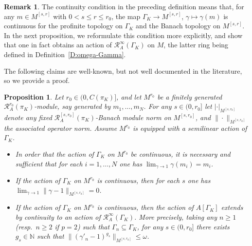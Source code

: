 \documentclass[12pt]{article}
\newtheorem{prop}[theorem]{Proposition}
\theoremstyle{definition}
\newtheorem{remark}[theorem]{Remark}
\numberwithin{equation}{theorem}
\newcommand{\calR}{\mathcal{R}}
\newcommand{\NN}{\mathbb{N}}
\begin{document}
\begin{remark}
The continuity condition in the preceding definition means that, for
any $m \in M^{[s,r]}$ with $0 < s \leq r \leq r_0$, the map $\Gamma_K
\to M^{[s,r]}$, $\gamma \mapsto \gamma(m)$ is continuous for the
profinite topology on $\Gamma_K$ and the Banach topology on
$M^{[s,r]}$.  In the next proposition, we reformulate this condition
more explicitly, and show that one in fact obtains an action of
$\calR_A^\infty(\Gamma_K)$ on $M$, the latter ring being defined in
Definition~\ref{D:omega-Gamma}.
\end{remark}

The following claims are well-known, but not well documented in the
literature, so we provide a proof.

\begin{prop}
\label{P:calR_A(Gamma_K) acts on M}
Let $r_0 \in (0,C(\pi_K)]$, and let $M^{r_0}$ be a finitely generated
  $\calR_A^{r_0}(\pi_K)$-module, say generated by $m_1,\ldots,m_N$.
  For any $s \in (0,r_0]$ let $|\cdot|_{M^{[s,r_0]}}$ denote any fixed
    $\calR_A^{[s,r_0]}(\pi_K)$-Banach module norm on $M^{[s,r_0]}$,
    and $\|\cdot\|_{M^{[s,r_0]}}$ the associated operator norm.
    Assume $M^{r_0}$ is equipped with a semilinear action of
    $\Gamma_K$.
\begin{itemize}
\item[(1)] In order that the action of $\Gamma_K$ on $M^{r_0}$ be
  continuous, it is necessary and sufficient that for each
  $i=1,\ldots,N$ one has $\lim_{\gamma \to 1} \gamma(m_i) = m_i$.
\item[(2)] If the action of $\Gamma_K$ on $M^{r_0}$ is continuous,
  then for each $s$ one has $\lim_{\gamma \to 1}
  \|\gamma-1\|_{M^{[s,r_0]}} = 0$.
\item[(3)] If the action of $\Gamma_K$ on $M^{r_0}$ is continuous,
  then the action of $A[\Gamma_K]$ extends by continuity to an action
  of $\calR^\infty_A(\Gamma_K)$.  More precisely, taking any $n \geq
  1$ (resp.\ $n \geq 2$ if $p=2$) such that $\Gamma_n \subseteq
  \Gamma_K$, for any $s \in (0,r_0]$ there exists $g_s \in \NN$ such
    that $\|(\gamma'_n-1)^{g_s}\|_{M^{[s,r_0]}} \leq \omega$.
\end{itemize}
\end{prop}
\end{document}
